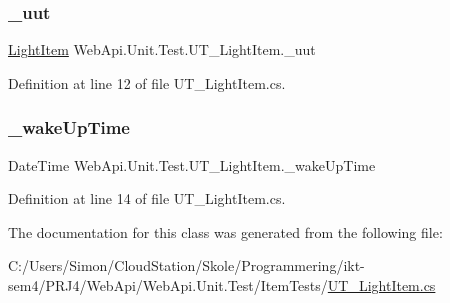 \subsubsection{\texorpdfstring{\+\_\+uut}{\_uut}}
{\footnotesize\ttfamily \mbox{\hyperlink{class_f_w_p_s_1_1_models_1_1_light_item}{Light\+Item}} Web\+Api.\+Unit.\+Test.\+U\+T\+\_\+\+Light\+Item.\+\_\+uut\hspace{0.3cm}{\ttfamily [private]}}



Definition at line 12 of file U\+T\+\_\+\+Light\+Item.\+cs.

\mbox{\label{class_web_api_1_1_unit_1_1_test_1_1_u_t___light_item_a659b97955c85eeb5b61ea436dddc45dd}} 
\subsubsection{\texorpdfstring{\+\_\+wake\+Up\+Time}{\_wakeUpTime}}
{\footnotesize\ttfamily Date\+Time Web\+Api.\+Unit.\+Test.\+U\+T\+\_\+\+Light\+Item.\+\_\+wake\+Up\+Time\hspace{0.3cm}{\ttfamily [private]}}



Definition at line 14 of file U\+T\+\_\+\+Light\+Item.\+cs.



The documentation for this class was generated from the following file\+:\begin{DoxyCompactItemize}
\item 
C\+:/\+Users/\+Simon/\+Cloud\+Station/\+Skole/\+Programmering/ikt-\/sem4/\+P\+R\+J4/\+Web\+Api/\+Web\+Api.\+Unit.\+Test/\+Item\+Tests/\mbox{\hyperlink{_u_t___light_item_8cs}{U\+T\+\_\+\+Light\+Item.\+cs}}\end{DoxyCompactItemize}
